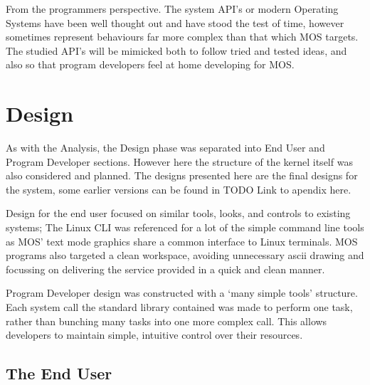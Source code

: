 \documentclass[a4paper]{report}
\begin{document}
From the programmers perspective. The system API's or modern Operating Systems have been well thought out and have stood the test of time, however sometimes represent behaviours far more complex than that which MOS targets. The studied API's will be mimicked both to follow tried and tested ideas, and also so that program developers feel at home developing for MOS.

































\clearpage
\chapter{Design}

As with the Analysis, the Design phase was separated into End User and Program Developer sections. However here the structure of the kernel itself was also considered and planned. The designs presented here are the final designs for the system, some earlier versions can be found in TODO Link to apendix here.

Design for the end user focused on similar tools, looks, and controls to existing systems; The Linux CLI was referenced for a lot of the simple command line tools as MOS' text mode graphics share a common interface to Linux terminals. MOS programs also targeted a clean workspace, avoiding unnecessary ascii drawing and focussing on delivering the service provided in a quick and clean manner.

Program Developer design was constructed with a `many simple tools' structure. Each system call the standard library contained was made to perform one task, rather than bunching many tasks into one more complex call. This allows developers to maintain simple, intuitive control over their resources.

\clearpage
\section{The End User}
\end{document}
